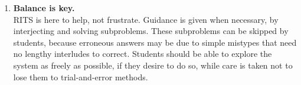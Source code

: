 \documentclass[a4paper,11pt]{article}
\begin{document}
\begin{enumerate}
\item \textbf{Balance is key.}\\ %
  RITS is here to help, not frustrate. Guidance is given when
  necessary, by interjecting and solving subproblems. These
  subproblems can be skipped by students, because erroneous answers
  may be due to simple mistypes that need no lengthy interludes to
  correct. Students should be able to explore the system as freely as
  possible, if they desire to do so, while care is taken not to lose
  them to trial-and-error methods.
  \end{enumerate}

\vfil
\end{document}
